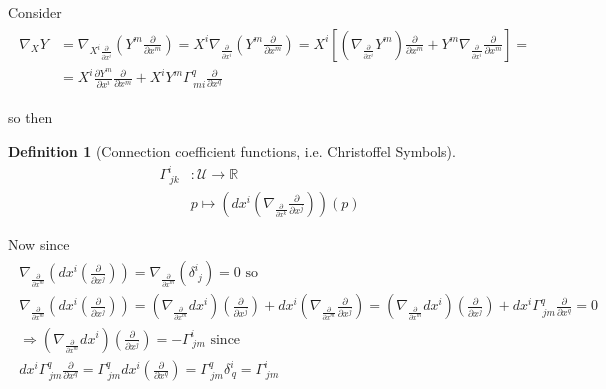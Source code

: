 \documentclass[10pt]{amsart}
\newtheorem{definition}{Definition}
\begin{document}
\begin{multicols*}{2}
Consider 
\[
\begin{gathered}
	\begin{aligned}
		\nabla_X Y & = \nabla_{X^i \frac{ \partial }{ \partial x^i} } \left(Y^m \frac{\partial }{ \partial x^m } \right) = X^i \nabla_{\frac{\partial}{\partial x^i} } \left( Y^m \frac{ \partial }{\partial x^m} \right) = X^i \left[ \left( \nabla_{\frac{ \partial }{ \partial x^i} } Y^m \right) \frac{\partial }{ \partial x^m} + Y^m \nabla_{\frac{\partial }{ \partial x^i} } \frac{\partial}{ \partial x^m} \right] = \\
		& = X^i \frac{\partial Y^m}{\partial x^i} \frac{\partial }{\partial x^m } + X^i Y^m  \Gamma^q_{ \, mi } \frac{\partial}{\partial x^q}
	\end{aligned}
\end{gathered}\]

so then

\begin{definition}[Connection coefficient functions, i.e. Christoffel Symbols]
	\begin{equation}
		\begin{aligned}
			\Gamma^i_{\, jk} & : \mathcal{U} \to \mathbb{R} \\
			& p \mapsto ( dx^i \left( \nabla_{\frac{\partial}{\partial x^k} } \frac{\partial }{ \partial x^j} \right) )(p)
		\end{aligned}
	\end{equation}
\end{definition}

Now since
\[
\begin{gathered}
	\begin{gathered}
		\nabla_{\frac{\partial}{\partial x^m} } \left( dx^i \left( \frac{ \partial }{ \partial x^j} \right) \right) = \nabla_{\frac{\partial}{\partial x^m} } (\delta^i_{\, \, j} ) = 0 \text{ so } \\
		\nabla_{\frac{\partial}{\partial x^m} } \left( dx^i \left( \frac{ \partial }{ \partial x^j} \right) \right) = \left( \nabla_{\frac{\partial}{\partial x^m} } dx^i \right) \left( \frac{\partial }{ \partial x^j} \right) + dx^i \left( \nabla_{\frac{\partial}{\partial x^m} } \frac{\partial }{ \partial x^j} \right) = \left( \nabla_{\frac{\partial}{\partial x^m} } dx^i \right) \left( \frac{\partial }{ \partial x^j} \right) + dx^i \Gamma^q_{\, jm} \frac{ \partial }{ \partial x^q} = 0 \\
		\Longrightarrow \boxed{ \left( \nabla_{\frac{\partial}{\partial x^m} } dx^i \right) \left( \frac{\partial }{ \partial x^j} \right) = -\Gamma^i_{\, jm} } \text{ since } \\
		dx^i \Gamma^q_{\,  jm} \frac{\partial }{ \partial x^q} = \Gamma^q_{\, jm} dx^i \left( \frac{\partial }{ \partial x^q} \right) = \Gamma^q_{\, jm} \delta^i_{\, q} = \Gamma^i_{\, jm}
	\end{gathered}
\end{gathered}\]


\end{multicols*}
\end{document}
